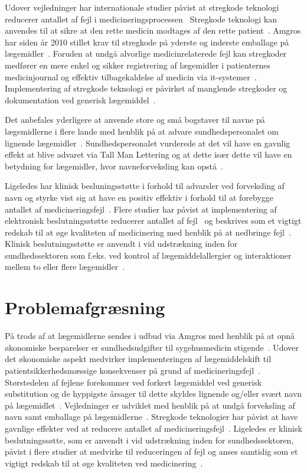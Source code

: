 Udover vejledninger har internationale studier påvist at stregkode teknologi reducerer antallet af fejl i medicineringsprocessen~\citep{Poon2006, Levtzion-korach2010} Stregkode teknologi kan anvendes til at sikre at den rette medicin modtages af den rette patient~\citep{Amgros2013}.  
Amgros har siden år 2010 stillet krav til stregkode på yderste og inderste emballage på lægemidler~\citep{Amgros2013}. Foruden at undgå alvorlige medicinrelaterede fejl kan stregkoder medfører en mere enkel og sikker registrering af lægemidler i patienternes medicinjournal og effektiv tilbagekaldelse af medicin via it-systemer~\citep{Amgros2013}. Implementering af stregkode teknologi er påvirket af manglende stregkoder og dokumentation ved generisk lægemiddel~\citep{Amgros2013}.

Det anbefales yderligere at anvende store og små bogstaver til navne på lægemidlerne i flere lande med henblik på at advare sundhedspersonalet om lignende lægemidler~\citep{ISMP2011,HQSC2013,ACSQ2011}. Sundhedspersonalet vurderede at det vil have en gavnlig effekt at blive advaret via Tall Man Lettering og at dette især dette vil have en betydning for lægemidler, hvor navneforveksling kan opstå~\citep{Campmans2018}.

Ligeledes har klinisk besluningsstøtte i forhold til advarsler ved forveksling af navn og styrke vist sig at have en positiv effektiv i forhold til at forebygge antallet af medicineringsfejl~\citep{Campmans2018}. Flere studier har påvist at implementering af elektronisk beslutningsstøtte reducerer antallet af fejl~\citep{DW1998,Bates2013,Cheng2011,Raboel2005} og beskrives som et vigtigt redskab til at øge kvaliteten af medicinering med henblik på at nedbringe fejl~\citep{Raboel2005}. Klinisk beslutningsstøtte er anvendt i vid udstrækning inden for sundhedssektoren som f.eks. ved kontrol af lægemiddelallergier og interaktioner mellem to eller flere lægemidler~\citep{Raboel2005}. 

\section{Problemafgræsning}
På trods af at lægemidlerne sendes i udbud via Amgros med henblik på at opnå økonomiske besparelser er sundhedsudgifter til sygehusmedicin stigende~\citep{Sundhed2016,Sygehusapoteket2017}. Udover det økonomiske aspekt medvirker implementeringen af lægemiddelskift til patientsikkerhedsmæssige konsekvenser på grund af medicineringsfejl~\citep{DanskSelskabforPatientsikkerhed2009,Hakonsen2010}. Størstedelen af fejlene forekommer ved forkert lægemiddel ved generisk substitution og de hyppigste årsager til dette skyldes lignende og/eller svært navn på lægemidlet~\citep{Hakonsen2010}. Vejledninger er udviklet med henblik på at undgå forveksling af navn samt emballage på lægemidlerne~\citep{DanskSelskabforPatientsikkerhed2009}. Stregkode teknologier har påvist at have gavnlige effekter ved at reducere antallet af medicineringsfejl~\citep{Poon2006, Levtzion-korach2010}. Ligeledes er klinisk beslutningssøtte, som er anvendt i vid udstrækning inden for sundhedssektoren, påvist i flere studier at medvirke til reduceringen af fejl og anses samtidig som et vigtigt redskab til at øge kvaliteten ved medicinering~\citep{DW1998,Bates2013,Cheng2011,Raboel2005}.

